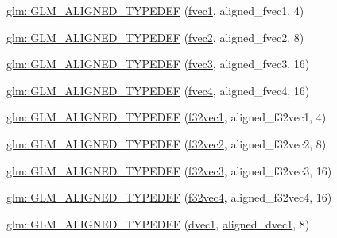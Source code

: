 \begin{DoxyCompactItemize}
\item 
\mbox{\hyperlink{group__gtx__type__aligned_gaefab04611c7f8fe1fd9be3071efea6cc}{glm\+::\+G\+L\+M\+\_\+\+A\+L\+I\+G\+N\+E\+D\+\_\+\+T\+Y\+P\+E\+D\+EF}} (\mbox{\hyperlink{group__gtc__type__precision_gaa732e5d06540922c44d3e35f32d6e948}{fvec1}}, aligned\+\_\+fvec1, 4)
\item 
\mbox{\hyperlink{group__gtx__type__aligned_ga2543c05ba19b3bd19d45b1227390c5b4}{glm\+::\+G\+L\+M\+\_\+\+A\+L\+I\+G\+N\+E\+D\+\_\+\+T\+Y\+P\+E\+D\+EF}} (\mbox{\hyperlink{group__gtc__type__precision_ga83fb34639f810d0c9240cf7ff0180e20}{fvec2}}, aligned\+\_\+fvec2, 8)
\item 
\mbox{\hyperlink{group__gtx__type__aligned_ga009afd727fd657ef33a18754d6d28f60}{glm\+::\+G\+L\+M\+\_\+\+A\+L\+I\+G\+N\+E\+D\+\_\+\+T\+Y\+P\+E\+D\+EF}} (\mbox{\hyperlink{group__gtc__type__precision_ga8480fdaa7fb8e177e57b367be79863d8}{fvec3}}, aligned\+\_\+fvec3, 16)
\item 
\mbox{\hyperlink{group__gtx__type__aligned_ga2f26177e74bfb301a3d0e02ec3c3ef53}{glm\+::\+G\+L\+M\+\_\+\+A\+L\+I\+G\+N\+E\+D\+\_\+\+T\+Y\+P\+E\+D\+EF}} (\mbox{\hyperlink{group__gtc__type__precision_ga396c4084cd7e5465f8b56035e0420c3e}{fvec4}}, aligned\+\_\+fvec4, 16)
\item 
\mbox{\hyperlink{group__gtx__type__aligned_ga309f495a1d6b75ddf195b674b65cb1e4}{glm\+::\+G\+L\+M\+\_\+\+A\+L\+I\+G\+N\+E\+D\+\_\+\+T\+Y\+P\+E\+D\+EF}} (\mbox{\hyperlink{group__gtc__type__precision_ga6fb588b465f2252b473582159c31c40c}{f32vec1}}, aligned\+\_\+f32vec1, 4)
\item 
\mbox{\hyperlink{group__gtx__type__aligned_ga5e185865a2217d0cd47187644683a8c3}{glm\+::\+G\+L\+M\+\_\+\+A\+L\+I\+G\+N\+E\+D\+\_\+\+T\+Y\+P\+E\+D\+EF}} (\mbox{\hyperlink{group__gtc__type__precision_ga8681dee3524dea86388178c49c27079a}{f32vec2}}, aligned\+\_\+f32vec2, 8)
\item 
\mbox{\hyperlink{group__gtx__type__aligned_gade4458b27b039b9ca34f8ec049f3115a}{glm\+::\+G\+L\+M\+\_\+\+A\+L\+I\+G\+N\+E\+D\+\_\+\+T\+Y\+P\+E\+D\+EF}} (\mbox{\hyperlink{group__gtc__type__precision_gab550330e62a7bc3fa9e6740b9421037c}{f32vec3}}, aligned\+\_\+f32vec3, 16)
\item 
\mbox{\hyperlink{group__gtx__type__aligned_ga2e8a12c5e6a9c4ae4ddaeda1d1cffe3b}{glm\+::\+G\+L\+M\+\_\+\+A\+L\+I\+G\+N\+E\+D\+\_\+\+T\+Y\+P\+E\+D\+EF}} (\mbox{\hyperlink{group__gtc__type__precision_ga6848e3b5cb5c1f4c117717b309e726eb}{f32vec4}}, aligned\+\_\+f32vec4, 16)
\item 
\mbox{\hyperlink{group__gtx__type__aligned_ga3e0f35fa0c626285a8bad41707e7316c}{glm\+::\+G\+L\+M\+\_\+\+A\+L\+I\+G\+N\+E\+D\+\_\+\+T\+Y\+P\+E\+D\+EF}} (\mbox{\hyperlink{namespaceglm_a8d5252eec287cf34cc18a219a118f9f2}{dvec1}}, \mbox{\hyperlink{group__gtc__type__aligned_ga81fe4410dc880770293c53fcba83c9e4}{aligned\+\_\+dvec1}}, 8)

\end{DoxyCompactItemize}
